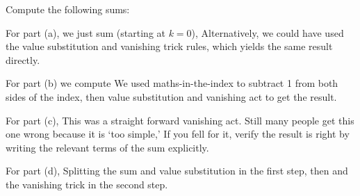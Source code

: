 Compute the following sums:

\solution
For part (a), we just sum (starting at $k=0$),
Alternatively, we could have used the value substitution and vanishing trick rules, which yields the same result directly.

For part (b) we compute
We used maths-in-the-index to subtract 1 from both sides of the index, then value substitution and vanishing act to get the result.

For part (c),
This was a straight forward vanishing act. Still many people get this one wrong because it is `too simple,' If you fell for it, verify the result is right by writing the relevant terms of the sum explicitly.

For part (d),
Splitting the sum and value substitution in the first step, then and the vanishing trick in the second step.


